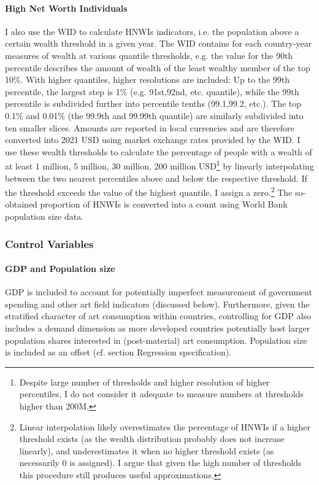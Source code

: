 \documentclass[11pt]{article}
\begin{document}
\paragraph*{High Net Worth Individuals}

I also use the WID to calculate HNWIs indicators, i.e. the population above a certain wealth threshold in a given year. 
The WID contains for each country-year measures of wealth at various quantile thresholds, e.g. the value for the 90th percentile describes the amount of wealth of the least wealthy member of the top 10\%.
With higher quantiles, higher resolutions are included: Up to the 99th percentile, the largest step is 1\% (e.g. 91st,92nd, etc. quantile), while the 99th percentile is subdivided further into percentile tenths (99.1,99.2, etc.).
The top 0.1\% and 0.01\% (the 99.9th and 99.99th quantile) are similarly subdivided into ten smaller slices.
Amounts are reported in local currencies and are therefore converted into 2021 USD using market exchange rates provided by the WID.
I use these wealth thresholds to calculate the percentage of people with a wealth of at least 1 million, 5 million, 30 million, 200 million USD\footnote{Despite large number of thresholds and higher resolution of higher percentiles, I do not consider it adequate to measure numbers at thresholds higher than 200M.} by linearly interpolating between the two nearest percentiles above and below the respective threshold.
If the threshold exceeds the value of the highest quantile, I assign a zero.\footnote{Linear interpolation likely overestimates the percentage of HNWIs if a higher threshold exists (as the wealth distribution probably does not increase linearly), and underestimates it when no higher threshold exists (as necessarily 0 is assigned). I argue that given the high number of thresholds this procedure still produces useful approximations.}
The so-obtained proportion of HNWIs is converted into a count using World Bank population size data.


\subsubsection*{Control Variables}

\paragraph*{GDP and Population size}

GDP is included to account for potentially imperfect measurement of government spending and other art field indicators (discussed below). 
Furthermore, given the stratified character of art consumption \parencite{Bourdieu_1984_distinction} within countries, controlling for GDP also includes a demand dimension as more developed countries potentially host larger population shares interested in (post-material) art consumption.
Population size is included as an offset (cf. section Regression specification). 
\end{document}
